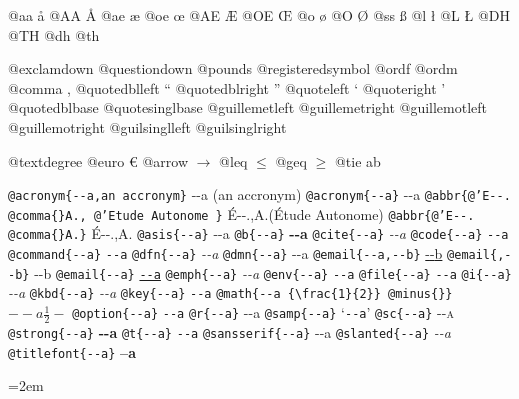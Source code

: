 \documentclass{book}
\newcommand\GNUTexinfocommandstylecodetextcite[1]{{\normalfont{}\textsl{#1}}}%
\begin{document}
@aa \aa{}
@AA \AA{}
@ae \ae{}
@oe \oe{}
@AE \AE{}
@OE \OE{}
@o \o{}
@O \O{}
@ss \ss{}
@l \l{}
@L \L{}
@DH \DH{}
@TH \TH{}
@dh \dh{}
@th \th{}

@exclamdown \textexclamdown{}
@questiondown \textquestiondown{}
@pounds \textsterling{}
@registeredsymbol \circledR{}
@ordf \textordfeminine{}
@ordm \textordmasculine{}
@comma ,
@quotedblleft \textquotedblleft{}
@quotedblright \textquotedblright{}
@quoteleft \textquoteleft{}
@quoteright \textquoteright{}
@quotedblbase \quotedblbase{}
@quotesinglbase \quotesinglbase{}
@guillemetleft \guillemotleft{}
@guillemetright \guillemotright{}
@guillemotleft \guillemotleft{}
@guillemotright \guillemotright{}
@guilsinglleft \guilsinglleft{}
@guilsinglright \guilsinglright{}

@textdegree \textdegree{}
@euro \euro{}
@arrow $\rightarrow{}$
@leq $\leq{}$
@geq $\geq{}$
@tie a\hbox{}b

\texttt{@acronym\{{-}{-}a,an accronym\}} {-}{-}a (an accronym)
\texttt{@acronym\{{-}{-}a\}} {-}{-}a
\texttt{@abbr\{@'E{-}{-}. @comma\{\}A., @'Etude Autonome \}} \'{E}{-}{-}.\@ ,A.\@ (\'{E}tude Autonome)
\texttt{@abbr\{@'E{-}{-}. @comma\{\}A.\}} \'{E}{-}{-}.\@ ,A.\@
\texttt{@asis\{{-}{-}a\}} {-}{-}a
\texttt{@b\{{-}{-}a\}} \textbf{{-}{-}a}
\texttt{@cite\{{-}{-}a\}} \GNUTexinfocommandstylecodetextcite{{-}{-}a}
\texttt{@code\{{-}{-}a\}} \texttt{{-}{-}a}
\texttt{@command\{{-}{-}a\}} \texttt{{-}{-}a}
\texttt{@dfn\{{-}{-}a\}} \textsl{{-}{-}a}
\texttt{@dmn\{{-}{-}a\}} {-}{-}a
\texttt{@email\{{-}{-}a,{-}{-}b\}} \href{mailto:--a}{{-}{-}b}
\texttt{@email\{,{-}{-}b\}} {-}{-}b
\texttt{@email\{{-}{-}a\}} \href{mailto:--a}{\nolinkurl{--a}}
\texttt{@emph\{{-}{-}a\}} \emph{{-}{-}a}
\texttt{@env\{{-}{-}a\}} \texttt{{-}{-}a}
\texttt{@file\{{-}{-}a\}} \texttt{{-}{-}a}
\texttt{@i\{{-}{-}a\}} \textit{{-}{-}a}
\texttt{@kbd\{{-}{-}a\}} {\ttfamily\textsl{{-}{-}a}}
\texttt{@key\{{-}{-}a\}} \texttt{{-}{-}a}
\texttt{@math\{{-}{-}a \{\textbackslash{}frac\{1\}\{2\}\} @minus\{\}\}} $--a {\frac{1}{2}} -$
\texttt{@option\{{-}{-}a\}} \texttt{{-}{-}a}
\texttt{@r\{{-}{-}a\}} \textnormal{{-}{-}a}
\texttt{@samp\{{-}{-}a\}} `\texttt{{-}{-}a}'
\texttt{@sc\{{-}{-}a\}} \textsc{{-}{-}a}
\texttt{@strong\{{-}{-}a\}} \textbf{{-}{-}a}
\texttt{@t\{{-}{-}a\}} \texttt{{-}{-}a}
\texttt{@sansserif\{{-}{-}a\}} \textsf{{-}{-}a}
\texttt{@slanted\{{-}{-}a\}} \textsl{{-}{-}a}
\texttt{@titlefont\{{-}{-}a\}} \endgroup{}%
{\huge \bfseries --a}\par\begingroup\obeylines\obeyspaces\frenchspacing\leftskip=2em\relax\parskip=0pt\relax\ttfamily{}%
\end{document}
